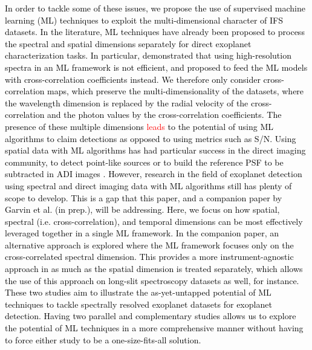 \documentclass{aa}
\newcommand{\newchange}[1]{\textcolor{black}{#1}}
\begin{document}
\newchange{In order to tackle some of these issues, we propose the use of supervised machine learning (ML) techniques to exploit the multi-dimensional character of IFS datasets. In the literature, ML techniques have already been proposed to process the spectral and spatial dimensions separately for direct exoplanet characterization tasks. In particular, \citet{2020Fisher} demonstrated that using high-resolution spectra in an ML framework is not efficient, and proposed to feed the ML models with cross-correlation coefficients instead. 
We therefore only consider cross-correlation maps, which preserve the multi-dimensionality of the datasets, where the wavelength dimension is replaced by the radial velocity of the cross-correlation and the photon values by the cross-correlation coefficients.  The presence of these multiple dimensions \textcolor{red}{leads} to the potential of using ML algorithms to claim detections as opposed to using metrics such as S/N.}
\newchange{Using spatial data with ML algorithms has had particular success in the direct imaging community, to detect point-like sources \citep{2018Gomez,2023Carlito} or to build the reference PSF to be subtracted in ADI images \citep{2022Gebhard,2023Flasseur}.}
\newchange{However, research in the field of exoplanet detection using spectral and direct imaging data with ML algorithms still has plenty of scope to develop. This is a gap that this paper, and a companion paper by Garvin et al. (in prep.), will be addressing.
Here, we   focus  on how spatial, spectral (i.e. cross-correlation), and temporal dimensions can be most effectively leveraged together in a single ML framework. In the companion paper, an alternative approach is explored where the ML framework focuses only on the cross-correlated spectral dimension. This provides a more instrument-agnostic approach in as much as the spatial dimension is treated separately, which allows the use of this approach on long-slit spectroscopy datasets as well, for instance. These two studies aim to illustrate the as-yet-untapped potential of ML techniques to tackle spectrally resolved exoplanet datasets for exoplanet detection.
Having two parallel and complementary studies allows us to explore the potential of ML techniques in a more comprehensive manner without having to force either study to be a one-size-fits-all solution.}
\end{document}
